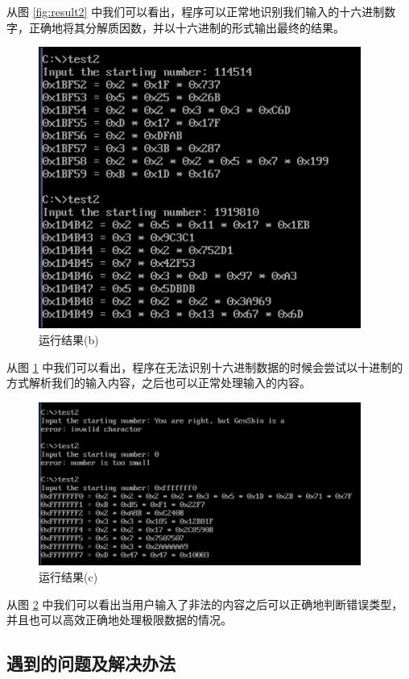 从图 \ref{fig:result2} 中我们可以看出，程序可以正常地识别我们输入的十六进制数字，正确地将其分解质因数，并以十六进制的形式输出最终的结果。

\begin{figure}
  \centering
  \includegraphics[width=300pt]{figure/test2res2.png}
  \caption{运行结果(b)}
  \label{fig:result3}
\end{figure}

从图 \ref{fig:result3} 中我们可以看出，程序在无法识别十六进制数据的时候会尝试以十进制的方式解析我们的输入内容，之后也可以正常处理输入的内容。

\begin{figure}
  \centering
  \includegraphics[width=300pt]{figure/test2res3.png}
  \caption{运行结果(c)}
  \label{fig:result4}
\end{figure}

从图 \ref{fig:result4} 中我们可以看出当用户输入了非法的内容之后可以正确地判断错误类型，并且也可以高效正确地处理极限数据的情况。

\subsection{遇到的问题及解决办法}

